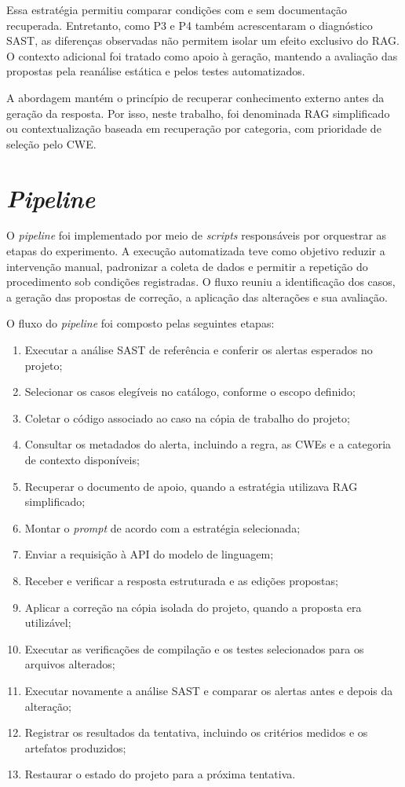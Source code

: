 Essa estratégia permitiu comparar condições com e sem documentação recuperada. Entretanto, como P3 e P4 também acrescentaram o diagnóstico SAST, as diferenças observadas não permitem isolar um efeito exclusivo do RAG. O contexto adicional foi tratado como apoio à geração, mantendo a avaliação das propostas pela reanálise estática e pelos testes automatizados.

A abordagem mantém o princípio de recuperar conhecimento externo antes da geração da resposta. Por isso, neste trabalho, foi denominada RAG simplificado ou contextualização baseada em recuperação por categoria, com prioridade de seleção pelo CWE.

\section{\textit{Pipeline}}
\label{sec:met-pipeline}

O \textit{pipeline} foi implementado por meio de \textit{scripts} responsáveis por orquestrar as etapas do experimento. A execução automatizada teve como objetivo reduzir a intervenção manual, padronizar a coleta de dados e permitir a repetição do procedimento sob condições registradas. O fluxo reuniu a identificação dos casos, a geração das propostas de correção, a aplicação das alterações e sua avaliação.

O fluxo do \textit{pipeline} foi composto pelas seguintes etapas:

\begin{enumerate}
    \item Executar a análise SAST de referência e conferir os alertas esperados no projeto;
    \item Selecionar os casos elegíveis no catálogo, conforme o escopo definido;
    \item Coletar o código associado ao caso na cópia de trabalho do projeto;
    \item Consultar os metadados do alerta, incluindo a regra, as CWEs e a categoria de contexto disponíveis;
    \item Recuperar o documento de apoio, quando a estratégia utilizava RAG simplificado;
    \item Montar o \textit{prompt} de acordo com a estratégia selecionada;
    \item Enviar a requisição à API do modelo de linguagem;
    \item Receber e verificar a resposta estruturada e as edições propostas;
    \item Aplicar a correção na cópia isolada do projeto, quando a proposta era utilizável;
    \item Executar as verificações de compilação e os testes selecionados para os arquivos alterados;
    \item Executar novamente a análise SAST e comparar os alertas antes e depois da alteração;
    \item Registrar os resultados da tentativa, incluindo os critérios medidos e os artefatos produzidos;
    \item Restaurar o estado do projeto para a próxima tentativa.
\end{enumerate}

